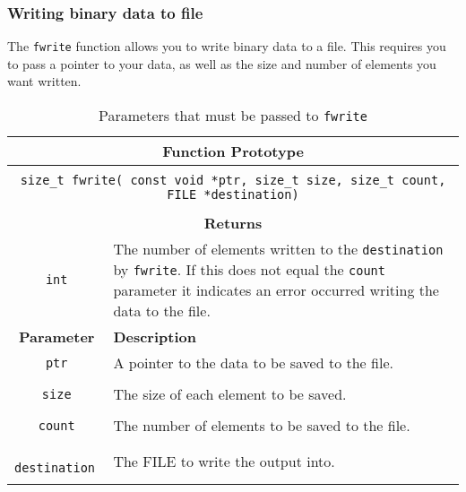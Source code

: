 



\subsubsection{Writing binary data to file} %
\label{ssub:writing_binary_data_to_file}

The \texttt{fwrite} function allows you to write binary data to a file. This requires you to pass a pointer to your data, as well as the size and number of elements you want written.

\begin{table}[h]
  \centering
  \begin{tabular}{|c|p{9cm}|}
    \hline
    \multicolumn{2}{|c|}{\textbf{Function Prototype}} \\
    \hline
    \multicolumn{2}{|c|}{} \\
    \multicolumn{2}{|c|}{\texttt{size\_t fwrite( const void *ptr, size\_t size, size\_t count, FILE *destination)}} \\
    \multicolumn{2}{|c|}{} \\
    \hline
    \multicolumn{2}{|c|}{\textbf{Returns}} \\
    \hline
    \texttt{int} & The number of elements written to the \texttt{destination} by \texttt{fwrite}. If this does not equal the \texttt{count} parameter it indicates an error occurred writing the data to the file.\\
    \hline
    \textbf{Parameter} & \textbf{Description} \\
    \hline
    \texttt{ ptr } & A pointer to the data to be saved to the file.\\
    & \\
    \texttt{ size } & The size of each element to be saved.\\
    & \\
    \texttt{ count } & The number of elements to be saved to the file.\\
    & \\
    \texttt{ destination } & The FILE to write the output into.\\
    & \\
    \hline
  \end{tabular}
  \caption{Parameters that must be passed to \texttt{fwrite}}
  \label{tbl:fwrite}
\end{table}

